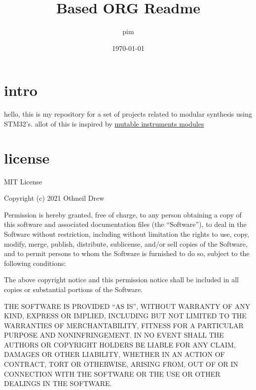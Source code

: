 \documentclass[11pt]{article}
\author{pim}
\date{\today}
\title{Based ORG Readme}
\begin{document}
\maketitle
\tableofcontents

\section{intro}
\label{sec:orgdd6a8f4}
hello, this is my repository for a set of projects related to modular synthesis using STM32's. allot of this is inspired by \href{https://github.com/pichenettes/eurorack}{mutable instruments modules}
\section{license}
\label{sec:org4d99cb1}
MIT License

Copyright (c) 2021 Othneil Drew

Permission is hereby granted, free of charge, to any person obtaining a copy
of this software and associated documentation files (the ``Software''), to deal
in the Software without restriction, including without limitation the rights
to use, copy, modify, merge, publish, distribute, sublicense, and/or sell
copies of the Software, and to permit persons to whom the Software is
furnished to do so, subject to the following conditions:

The above copyright notice and this permission notice shall be included in all
copies or substantial portions of the Software.

THE SOFTWARE IS PROVIDED ``AS IS'', WITHOUT WARRANTY OF ANY KIND, EXPRESS OR
IMPLIED, INCLUDING BUT NOT LIMITED TO THE WARRANTIES OF MERCHANTABILITY,
FITNESS FOR A PARTICULAR PURPOSE AND NONINFRINGEMENT. IN NO EVENT SHALL THE
AUTHORS OR COPYRIGHT HOLDERS BE LIABLE FOR ANY CLAIM, DAMAGES OR OTHER
LIABILITY, WHETHER IN AN ACTION OF CONTRACT, TORT OR OTHERWISE, ARISING FROM,
OUT OF OR IN CONNECTION WITH THE SOFTWARE OR THE USE OR OTHER DEALINGS IN THE
SOFTWARE.
\end{document}
